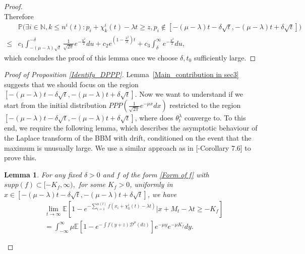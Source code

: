 \documentclass[a4paper,reqno]{amsart}%
\newcommand{\1}{\mathbf 1}
\theoremstyle{mine}
\numberwithin{theorem}{section}
\newtheorem{lemma}[theorem]{Lemma}
\numberwithin{equation}{section}
\theoremstyle{remark}
\begin{document}
\begin{proof}
\begin{equation}
  \end{equation}
  Therefore
     \begin{align*}
      &\mathbb{P} \biggl(\exists i\in \mathbb N, k \le n^{i}(t):p_{i}+\chi_k^i(t)-\lambda t \ge z,p_i\notin[-(\mu - \lambda)t-\delta\sqrt{t},-(\mu -\lambda)t+\delta\sqrt{t}]\biggr)\\
  \le&c_{1}\int_{-(\mu-\lambda)\sqrt{t}}^{-\delta}\frac{1}{\sqrt{2\pi}}e^{-\frac{u^{2}}{2}}du +c_{2}e^{(1-\frac{\lambda^{2}}{2})t}+ c_{3}\int_{\delta}^{\infty}e^{-\frac{u^{2}}{2}}du,
     \end{align*}
which concludes the proof of this lemma once we choose $\delta, t_0$ sufficiently large.
\end{proof}

\begin{proof}[Proof of Proposition \ref{Identify_DPPP}]
Lemma~\ref{Main_contribution in sec3} suggests that we should focus on the region $[-(\mu-\lambda)t - \delta\sqrt{t},-(\mu - \lambda)t + \delta\sqrt{t}]$.
Now we want to understand if we start from the initial distribution $PPP(\frac{1}{\sqrt{2\pi}}e^{-\mu x}dx)$ restricted to the region $[-(\mu-\lambda)t - \delta\sqrt{t},-(\mu - \lambda)t + \delta\sqrt{t}]$, where does $\theta^{\lambda}_{t}$ converge to. 
To this end, we require the following lemma, which describes the asymptotic behaviour of the Laplace transform of the BBM with drift, conditioned on the event that the maximum is unusually large. 
We use a similar approach as in [\cite{bovier2014extremal}-Corollary 7.6] to prove this.
\begin{lemma}\label{gap_convergence}
    For any fixed $\delta >0$ and $f$ of the form \ref{Form of f} with $supp (f) \subset [-K_f, \infty), $ for some $K_f>0$, uniformly in $x\in[-(\mu -\lambda)t-\delta\sqrt{t},-(\mu -\lambda)t+\delta\sqrt{t}]$, we have
\begin{equation}
  \begin{aligned}
    &\lim_{t\to\infty}\mathbb{E}[1-e^{-\sum_{i = 1}^{n(t)} f(x_{i}+\chi_{k}^{i}(t) - \lambda t)}|x+M_{t} -\lambda t\ge -K_{f}]\\
    & = \int_{-\infty}^{\infty}\mu \mathbb{E}[1-e^{-\int f(y+z)\mathcal{D}^{\mu}(dz) }]e^{-\mu y}e^{-\mu K_{f}}dy. \label{Eqn_contional M_t_app1}
 \end{aligned}
\end{equation}
\end{lemma}


\end{proof}
\end{document}
